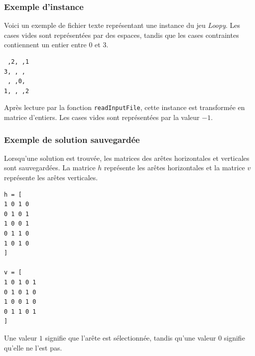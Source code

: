 \subsubsection{Exemple d'instance}

Voici un exemple de fichier texte représentant une instance du jeu \textit{Loopy}. Les cases vides sont représentées par des espaces, tandis que les cases contraintes contiennent un entier entre \(0\) et \(3\).

\begin{verbatim}
 ,2, ,1
3, , , 
 , ,0, 
1, , ,2
\end{verbatim}

Après lecture par la fonction \texttt{readInputFile}, cette instance est transformée en matrice d'entiers. Les cases vides sont représentées par la valeur \(-1\).

\subsubsection{Exemple de solution sauvegardée}

Lorsqu'une solution est trouvée, les matrices des arêtes horizontales et verticales sont sauvegardées. La matrice \(h\) représente les arêtes horizontales et la matrice \(v\) représente les arêtes verticales.

\begin{verbatim}
h = [
1 0 1 0
0 1 0 1
1 0 0 1
0 1 1 0
1 0 1 0
]

v = [
1 0 1 0 1
0 1 0 1 0
1 0 0 1 0
0 1 1 0 1
]
\end{verbatim}

Une valeur \(1\) signifie que l'arête est sélectionnée, tandis qu'une valeur \(0\) signifie qu'elle ne l'est pas.

